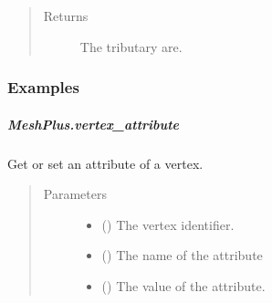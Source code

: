 \documentclass[letterpaper,10pt,english]{sphinxmanual}
\begin{document}
\begin{fulllineitems}
\begin{fulllineitems}
\begin{quote}
\begin{description}
\item[{Returns}] \leavevmode
{} \textendash{} The tributary are.

\end{description}\end{quote}
\subsubsection*{Examples}

\begin{sphinxVerbatim}[commandchars=\\\{\}]
\end{sphinxVerbatim}

\end{fulllineitems}



\subparagraph{MeshPlus.vertex\_attribute}
\label{\detokenize{api/generated/directional_clustering.mesh.MeshPlus.vertex_attribute:meshplus-vertex-attribute}}\label{\detokenize{api/generated/directional_clustering.mesh.MeshPlus.vertex_attribute::doc}}

\begin{fulllineitems}
\label{\detokenize{api/generated/directional_clustering.mesh.MeshPlus.vertex_attribute:directional_clustering.mesh.MeshPlus.vertex_attribute}}
Get or set an attribute of a vertex.
\begin{quote}\begin{description}
\item[{Parameters}] \leavevmode\begin{itemize}
\item {} 
 () \textendash{} The vertex identifier.

\item {} 
 () \textendash{} The name of the attribute

\item {} 
 () \textendash{} The value of the attribute.


\end{itemize}
\end{description}
\end{quote}
\end{fulllineitems}
\end{fulllineitems}
\end{document}
